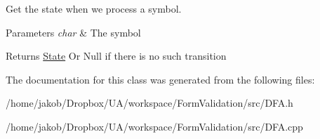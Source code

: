 Get the state when we process a symbol. 


\begin{DoxyParams}{Parameters}
{\em char} & The symbol\\
\hline
\end{DoxyParams}
\begin{DoxyReturn}{Returns}
\hyperlink{classFA_1_1State}{State} Or Null if there is no such transition 
\end{DoxyReturn}


The documentation for this class was generated from the following files\-:\begin{DoxyCompactItemize}
\item 
/home/jakob/\-Dropbox/\-U\-A/workspace/\-Form\-Validation/src/D\-F\-A.\-h\item 
/home/jakob/\-Dropbox/\-U\-A/workspace/\-Form\-Validation/src/D\-F\-A.\-cpp\end{DoxyCompactItemize}
